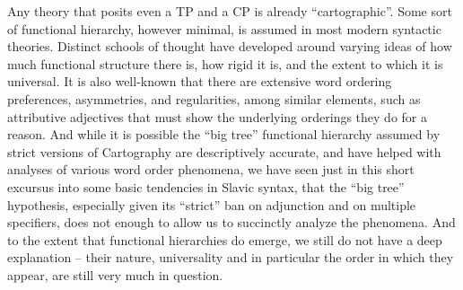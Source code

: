 \documentclass[output=paper,colorlinks,citecolor=brown,
]{langscibook}
\begin{document}
Any theory that posits even a TP and a CP is already “cartographic”.  Some sort of functional hierarchy, however minimal, is assumed in most modern syntactic theories. Distinct schools of thought have developed around varying ideas of how much functional structure there is, how rigid it is, and the extent to which it is universal. It is also well-known that there are extensive word ordering preferences, asymmetries, and regularities, among similar elements, such as attributive adjectives that must show the underlying orderings they do for a reason. And while it is possible the “big tree” functional hierarchy assumed by strict versions of Cartography are descriptively accurate, and have helped with analyses of various word order phenomena, we have seen just in this short excursus into some basic tendencies in Slavic syntax, that the “big tree” hypothesis, especially given its “strict” ban on adjunction and on multiple specifiers,  does not enough to allow us to succinctly analyze the phenomena.  And to the extent that functional hierarchies do emerge, we still do not have a deep explanation – their nature, universality and in particular the order in which they appear, are still very much in question.   
\end{document}
